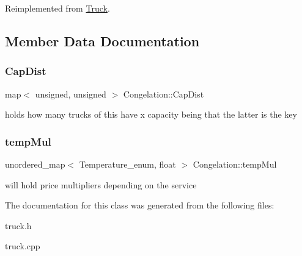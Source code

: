Reimplemented from \hyperlink{class_truck_a38f09eab2822524e355ecf6d0a13f7de}{Truck}.



\subsection{Member Data Documentation}
\mbox{\label{class_congelation_aaa0f7881a3e1e58c35176bdd22e27425}} 
\subsubsection{\texorpdfstring{Cap\+Dist}{CapDist}}
{\footnotesize\ttfamily map$<$ unsigned, unsigned $>$ Congelation\+::\+Cap\+Dist\hspace{0.3cm}{\ttfamily [static]}}

holds how many trucks of this have x capacity being that the latter is the key \mbox{\label{class_congelation_aa0cf9fa825aa450ff04d58e5e733706b}} 
\subsubsection{\texorpdfstring{temp\+Mul}{tempMul}}
{\footnotesize\ttfamily unordered\+\_\+map$<$ Temperature\+\_\+enum, float $>$ Congelation\+::temp\+Mul\hspace{0.3cm}{\ttfamily [static]}}

will hold price multipliers depending on the service 

The documentation for this class was generated from the following files\+:\begin{DoxyCompactItemize}
\item 
truck.\+h\item 
truck.\+cpp\end{DoxyCompactItemize}
